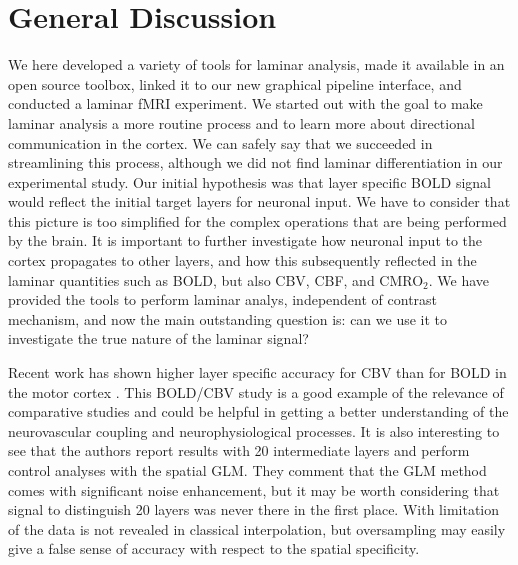 \section{General Discussion}
We here developed a variety of tools for laminar analysis, made it available in an open source toolbox, linked it to our new graphical pipeline interface, and conducted a laminar fMRI experiment. We started out with the goal to make laminar analysis a more routine process and to learn more about directional communication in the cortex. We can safely say that we succeeded in streamlining this process, although we did not find laminar differentiation in our experimental study. Our initial hypothesis was that layer specific BOLD signal would reflect the initial target layers for neuronal input. We have to consider that this picture is too simplified for the complex operations that are being performed by the brain. It is important to further investigate how neuronal input to the cortex propagates to other layers, and how this subsequently reflected in the laminar quantities such as BOLD, but also CBV, CBF, and CMRO$_2$. We have provided the tools to perform laminar analys, independent of contrast mechanism, and now the main outstanding question is: can we use it to investigate the true nature of the laminar signal?

Recent work has shown higher layer specific accuracy for CBV than for BOLD in the motor cortex \cite{Huber2018}. This BOLD/CBV study is a good example of the relevance of comparative studies and could be helpful in getting a better understanding of the neurovascular coupling and neurophysiological processes. It is also interesting to see that the authors report results with 20 intermediate layers and perform control analyses with the spatial GLM. They comment that the GLM method comes with significant noise enhancement, but it may be worth considering that signal to distinguish 20 layers was never there in the first place. With limitation of the data is not revealed in classical interpolation, but oversampling may easily give a false sense of accuracy with respect to the spatial specificity.

